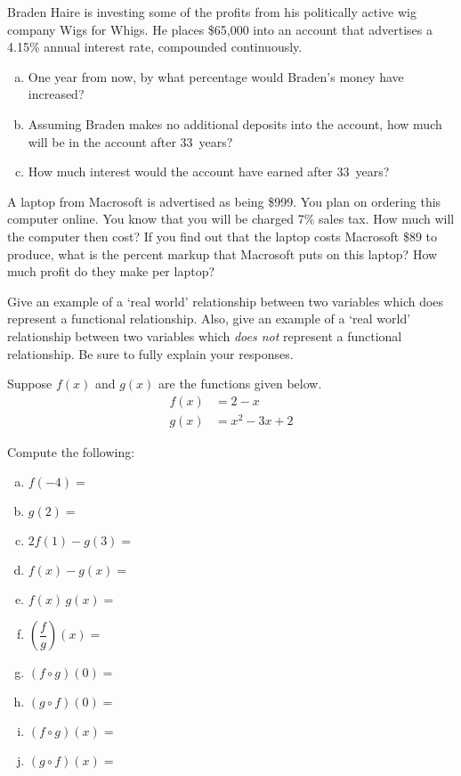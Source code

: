\documentclass[11pt,letterpaper]{article}
\begin{document}
\prob Braden Haire is investing some of the profits from his politically active wig company Wigs for Whigs. He places \$65,000 into an account that advertises a 4.15\% annual interest rate, compounded continuously. 
	\begin{enumerate}[(a)]
	\item One year from now, by what percentage would Braden's money have increased?
	\item Assuming Braden makes no additional deposits into the account, how much will be in the account after 33~years?
	\item How much interest would the account have earned after 33~years?
	\end{enumerate} \pspace


\prob A laptop from Macrosoft is advertised as being \$999. You plan on ordering this computer online. You know that you will be charged 7\% sales tax. How much will the computer then cost? If you find out that the laptop costs Macrosoft \$89 to produce, what is the percent markup that Macrosoft puts on this laptop? How much profit do they make per laptop? \pspace 


\prob Give an example of a `real world' relationship between two variables which does represent a functional relationship. Also, give an example of a `real world' relationship between two variables which \textit{does not} represent a functional relationship. Be sure to fully explain your responses. \pspace 


\prob Suppose $f(x)$ and $g(x)$ are the functions given below. 
	\[
	\begin{aligned}
	f(x)&= 2 - x \\[0.3cm]
	g(x)&= x^2 - 3x + 2
	\end{aligned}
	\]

Compute the following: 
        \begin{enumerate}[(a)]
        \item $f(-4)=$ 
        \item $g(2)=$ 
        \item $2f(1) - g(3)=$ 
        \item $f(x) - g(x)=$ 
        \item $f(x) \, g(x)=$ 
        \item $\left( \dfrac{f}{g} \right)(x)=$ 
        \item $(f \circ g)(0)=$ 
        \item $(g \circ f)(0)=$ 
        \item $(f \circ g)(x)=$ 
        \item $(g \circ f)(x)=$ 
        \end{enumerate} \pspace 
\end{document}
